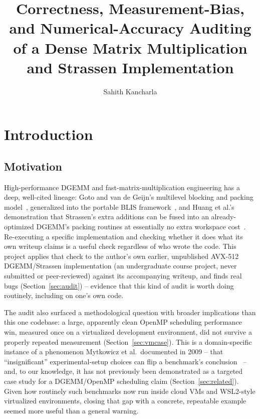 \documentclass[acmsmall]{acmart}
\title{Correctness, Measurement-Bias, and Numerical-Accuracy Auditing
  of a Dense Matrix Multiplication and Strassen Implementation}
\author{Sahith Kancharla}
\affiliation{%
  \institution{Virginia Tech, Department of Computer Science}
  \country{USA}
}
\begin{document}
\maketitle

\section{Introduction}

\subsection{Motivation}

High-performance DGEMM and fast-matrix-multiplication engineering has a
deep, well-cited lineage: Goto and van de Geijn's multilevel blocking and
packing model~\cite{goto2008anatomy}, generalized into the portable BLIS
framework~\cite{vanzee2016blis}, and Huang et al.'s demonstration that
Strassen's extra additions can be fused into an already-optimized
DGEMM's packing routines at essentially no extra workspace
cost~\cite{huang2016strassen}. Re-executing a specific implementation
and checking whether it does what its own writeup claims is a useful
check regardless of who wrote the code. This project applies that check
to the author's own earlier, unpublished AVX-512 DGEMM/Strassen
implementation (an undergraduate course project, never submitted or
peer-reviewed) against its accompanying writeup, and finds real bugs
(Section~\ref{sec:audit}) -- evidence that this kind of audit is worth
doing routinely, including on one's own code.

The audit also surfaced a methodological question with broader
implications than this one codebase: a large, apparently clean OpenMP
scheduling performance win, measured once on a virtualized development
environment, did not survive a properly repeated measurement
(Section~\ref{sec:vmcase}). This is a domain-specific instance of a
phenomenon Mytkowicz et al.\ documented in 2009 -- that
``insignificant'' experimental-setup choices can flip a benchmark's
conclusion~\cite{mytkowicz2009producing} -- and, to our knowledge, it
has not previously been demonstrated as a targeted case study for a
DGEMM/OpenMP scheduling claim (Section~\ref{sec:related}). Given how
routinely such benchmarks now run inside cloud VMs and WSL2-style
virtualized environments, closing that gap with a concrete, repeatable
example seemed more useful than a general warning.
\end{document}
